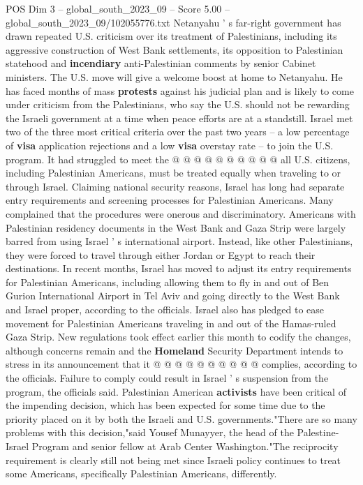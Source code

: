 \begin{textsample}{POS Dim 3 – global\_south\_2023\_09 – Score 5.00 – global\_south\_2023\_09/102055776.txt}
Netanyahu ' s far-right government has drawn repeated U.S. criticism over its treatment of Palestinians, including its aggressive construction of West Bank settlements, its opposition to Palestinian statehood and \textbf{incendiary} anti-Palestinian comments by senior Cabinet ministers.
The U.S. move will give a welcome boost at home to Netanyahu.
He has faced months of mass \textbf{protests} against his judicial plan and is likely to come under criticism from the Palestinians, who say the U.S. should not be rewarding the Israeli government at a time when peace efforts are at a standstill.
Israel met two of the three most critical criteria over the past two years -- a low percentage of \textbf{visa} application rejections and a low \textbf{visa} overstay rate -- to join the U.S. program.
It had struggled to meet the @ @ @ @ @ @ @ @ @ @ all U.S. citizens, including Palestinian Americans, must be treated equally when traveling to or through Israel.
Claiming national security reasons, Israel has long had separate entry requirements and screening processes for Palestinian Americans.
Many complained that the procedures were onerous and discriminatory.
Americans with Palestinian residency documents in the West Bank and Gaza Strip were largely barred from using Israel ' s international airport.
Instead, like other Palestinians, they were forced to travel through either Jordan or Egypt to reach their destinations.
In recent months, Israel has moved to adjust its entry requirements for Palestinian Americans, including allowing them to fly in and out of Ben Gurion International Airport in Tel Aviv and going directly to the West Bank and Israel proper, according to the officials.
Israel also has pledged to ease movement for Palestinian Americans traveling in and out of the Hamas-ruled Gaza Strip.
New regulations took effect earlier this month to codify the changes, although concerns remain and the \textbf{Homeland} Security Department intends to stress in its announcement that it @ @ @ @ @ @ @ @ @ @ complies, according to the officials.
Failure to comply could result in Israel ' s suspension from the program, the officials said.
Palestinian American \textbf{activists} have been critical of the impending decision, which has been expected for some time due to the priority placed on it by both the Israeli and U.S. governments."There are so many problems with this decision,"said Yousef Munayyer, the head of the Palestine-Israel Program and senior fellow at Arab Center Washington."The reciprocity requirement is clearly still not being met since Israeli policy continues to treat some Americans, specifically Palestinian Americans, differently.

\end{textsample}
